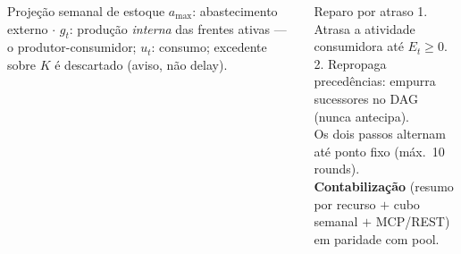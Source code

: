 \documentclass[aspectratio=169,10pt]{beamer}
\begin{document}
\begin{frame}
\begin{columns}[T]
\begin{block}{Projeção semanal de estoque}
      \scriptsize $a_{\max}$: abastecimento externo $\cdot$ $g_t$: produção
      \emph{interna} das frentes ativas --- o produtor-consumidor;
      $u_t$: consumo; excedente sobre $K$ é descartado (aviso, não delay).
    \end{block}
    \vspace{4pt}
    \begin{exampleblock}{\small Reparo por atraso}
      \scriptsize
      1. Atrasa a atividade consumidora até $E_t \geq 0$.\\
      2. Repropaga precedências: empurra sucessores no DAG
      (nunca antecipa).\\
      Os dois passos alternam até ponto fixo (máx.\ 10 rounds).\\
      \textbf{Contabilização} (resumo por recurso $+$ cubo semanal $+$
      MCP/REST) em paridade com pool.
    \end{exampleblock}
  \end{columns}
\end{frame}
\end{document}
